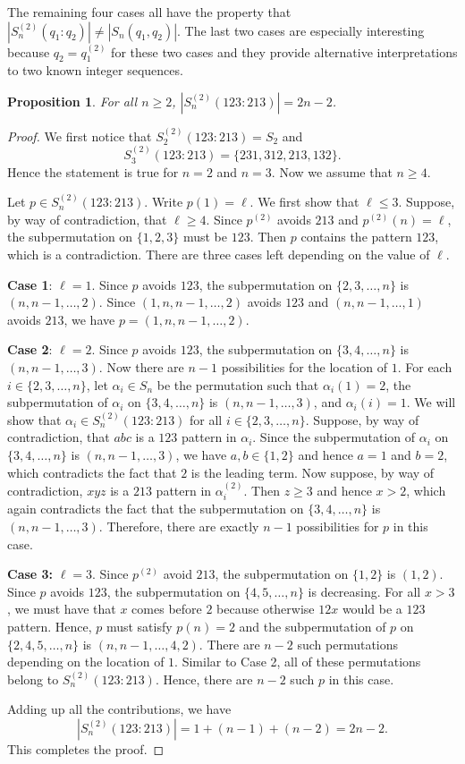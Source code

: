 \documentclass[11pt]{article}
\newtheorem{proposition}[theorem]{Proposition}
\theoremstyle{definition}
\numberwithin{equation}{section}
\begin{document}
The remaining four cases all have the property that $|S_n^{(2)}(q_1:q_2)|\neq|S_n(q_1,q_2)|$. The last two cases are especially interesting because $q_2=q_1^{(2)}$ for these two cases and they provide alternative 
interpretations to two known integer sequences.
\begin{proposition}\label{Prop:123;213}
For all $n\geq2$, $|S_n^{(2)}(123:213)|=2n-2$.
\end{proposition}
\begin{proof}
We first notice that $S_2^{(2)}(123:213)=S_2$ and
\[
S_3^{(2)}(123:213)=\{231,312,213,132\}.
\]
Hence the statement is true for $n=2$ and $n=3$. Now we assume that $n\geq4$.


    Let $p\in S_n^{(2)}(123:213)$. Write $p(1)=\ell$. We first show that $\ell\leq 3$. Suppose, by way of contradiction, that $\ell\geq4$. Since $p^{(2)}$ avoids $213$ and $p^{(2)}(n)=\ell$, the subpermutation on $\{1,2,3\}$ must be $123$. Then $p$ contains the pattern $123$, which is a contradiction. There are three cases left depending on the value of $\ell$.

    \textbf{Case 1}: $\ell=1$. Since $p$ avoids $123$, the subpermutation on $\{2,3,\ldots,n\}$ is $(n,n-1,\ldots,2)$. Since $(1,n,n-1,\ldots,2)$ avoids $123$ and $(n,n-1,\ldots,1)$ avoids $213$, we have $p=(1,n,n-1,\ldots,2)$.

    \textbf{Case 2}: $\ell=2$. Since $p$ avoids $123$, the subpermutation on $\{3,4,\ldots,n\}$ is $(n,n-1,\ldots,3)$. Now there are $n-1$ possibilities for the location of $1$. For each $i\in\{2,3,\ldots,n\}$, let $\alpha_i\in S_n$ be the permutation such that $\alpha_i(1)=2$, the subpermutation of $\alpha_i$ on $\{3,4,\ldots,n\}$ is $(n,n-1,\ldots,3)$, and $\alpha_i(i)=1$. We will show that $\alpha_i\in S_n^{(2)}(123:213)$ for all $i\in\{2,3,\ldots,n\}$. 
Suppose, by way of contradiction, that $abc$ is a $123$ pattern in $\alpha_i$. Since the subpermutation of $\alpha_i$ on $\{3,4,\ldots,n\}$ is $(n,n-1,\ldots,3)$, we have $a,b\in\{1,2\}$ and hence $a=1$ and $b=2$, which contradicts the fact that $2$ is the leading term. Now suppose, by way of contradiction, $xyz$ is a $213$ pattern in $\alpha_i^{(2)}$. Then $z\geq3$ and hence $x>2$, which again contradicts the fact that the subpermutation on $\{3,4,\ldots,n\}$ is $(n,n-1,\ldots,3)$. Therefore, there are exactly $n-1$ possibilities for $p$ in this case.
    
    \textbf{Case 3:} $\ell=3$. Since $p^{(2)}$ avoid $213$, the subpermutation on $\{1,2\}$ is $(1,2)$. Since $p$ avoids $123$, the subpermutation on $\{4,5,\ldots,n\}$ is decreasing. For all $x>3$, we must have that $x$ comes before $2$ because otherwise $12x$ would be a $123$ pattern. Hence, $p$ must satisfy $p(n)=2$ and the subpermutation of $p$ on $\{2,4,5,\ldots,n\}$ is $(n,n-1,\ldots,4,2)$. There are $n-2$ such permutations depending on the location of $1$. Similar to Case 2, 
all of these permutations belong to $S_n^{(2)}(123:213)$. Hence, there are $n-2$ such $p$ in this case.

    Adding up all the contributions, we have 
    \[
    |S_n^{(2)}(123:213)|=1+(n-1)+(n-2)=2n-2.
    \]
    This completes the proof.
\end{proof}
\end{document}
